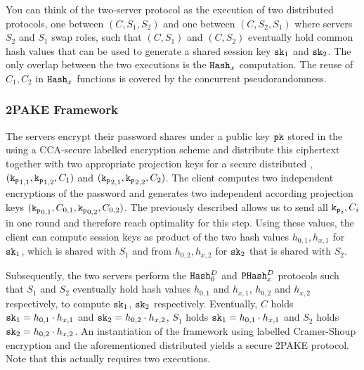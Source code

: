 You can think of the two-server protocol as the execution of two distributed \SPHFF protocols, one between $(C,S_1,S_2)$ and one between $(C,S_2,S_1)$ where servers $S_2$ and $S_1$ swap roles, such that $(C,S_1)$ and $(C,S_2)$ eventually hold common hash values that can be used to generate a shared session key $\mathtt{sk}_1$ and $\mathtt{sk}_2$.
The only overlap between the two \SPHFF executions is the $\mathtt{Hash}_x$ computation.
The reuse of $C_1,C_2$ in $\mathtt{Hash}_x$ functions is covered by the concurrent pseudorandomness.

\subsubsection{2PAKE Framework}
The servers encrypt their password shares under a public key $\mathtt{pk}$ stored in the \crs using a CCA-secure labelled encryption scheme and distribute this ciphertext together with two appropriate projection keys for a secure distributed \SPHFF, $(\mathtt{k_p}_{1,1},\mathtt{k_p}_{1,2},C_1)$ and $(\mathtt{k_p}_{2,1},\mathtt{k_p}_{2,2},C_2)$.
The client computes two independent encryptions of the password and generates two independent according projection keys $(\mathtt{k_p}_{0,1},C_{0,1},\mathtt{k_p}_{0,2},C_{0,2})$.
The previously described \SPHFF allows us to send all $\mathtt{k_p}_i,C_i$ in one round and therefore reach optimality for this step.
Using these values, the client can compute session keys as product of the two hash values $h_{0,1},h_{x,1}$ for $\mathtt{sk}_1$, which is shared with $S_1$ and from $h_{0,2},h_{x,2}$ for $\mathtt{sk}_2$ that is shared with $S_2$.

Subsequently, the two servers perform the $\mathtt{Hash}_0^D$ and $\mathtt{PHash}_x^D$ protocols such that $S_1$ and $S_2$ eventually hold hash values $h_{0,1}$ and $h_{x,1}$, $h_{0,2}$ and $h_{x,2}$ respectively, to compute $\mathtt{sk}_1$, $\mathtt{sk}_2$ respectively.
Eventually, $C$ holds $\mathtt{sk}_1=h_{0,1}\cdot h_{x,1}$ and $\mathtt{sk}_2=h_{0,2}\cdot h_{x,2}$, $S_1$ holds $\mathtt{sk}_1=h_{0,1}\cdot h_{x,1}$ and $S_2$ holds $\mathtt{sk}_2=h_{0,2}\cdot h_{x,2}$.
An instantiation of the framework using labelled Cramer-Shoup encryption and the aforementioned distributed \SPHFF yields a secure 2PAKE protocol.
Note that this actually requires two \SPHFF executions.

